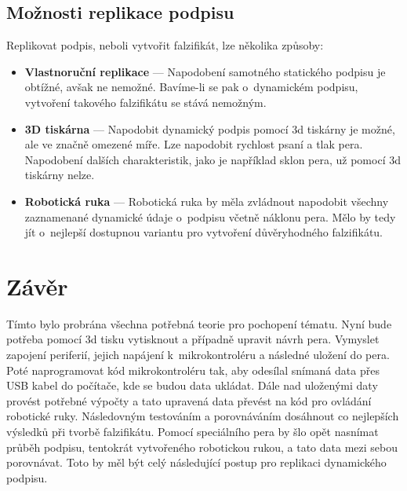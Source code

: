 \section{Možnosti replikace podpisu}
Replikovat podpis, neboli vytvořit falzifikát, lze několika způsoby:

\begin{itemize}
  \item \textbf{Vlastnoruční replikace} --- 
  Napodobení samotného statického podpisu je obtížné, avšak ne nemožné. 
  Bavíme-li se pak o~dynamickém podpisu, vytvoření takového falzifikátu se stává nemožným.

  \item \textbf{3D tiskárna} ---
  Napodobit dynamický podpis pomocí 3d tiskárny je možné, ale ve značně omezené míře.
  Lze napodobit rychlost psaní a tlak pera. 
  Napodobení dalších charakteristik, jako je například sklon pera, už pomocí 3d tiskárny nelze.

  \item \textbf{Robotická ruka} ---
  Robotická ruka by měla zvládnout napodobit všechny zaznamenané dynamické údaje o~podpisu včetně náklonu pera.
  Mělo by tedy jít o~nejlepší dostupnou variantu pro vytvoření důvěryhodného falzifikátu. 
\end{itemize}

\chapter{Závěr}
Tímto bylo probrána všechna potřebná teorie pro pochopení tématu.
Nyní bude potřeba pomocí 3d tisku vytisknout a případně upravit návrh pera.
Vymyslet zapojení periferií, jejich napájení k~mikrokontroléru a následné uložení do pera.
Poté naprogramovat kód mikrokontroléru tak, aby odesílal snímaná data přes USB kabel do počítače, kde se budou data ukládat.
Dále nad uloženými daty provést potřebné výpočty a tato upravená data převést na kód pro ovládání robotické ruky.
Následovným testováním a porovnáváním dosáhnout co nejlepších výsledků při tvorbě falzifikátu.
Pomocí speciálního pera by šlo opět nasnímat průběh podpisu, tentokrát vytvořeného robotickou rukou, a tato data mezi sebou porovnávat.
Toto by měl být celý následující postup pro replikaci dynamického podpisu.



